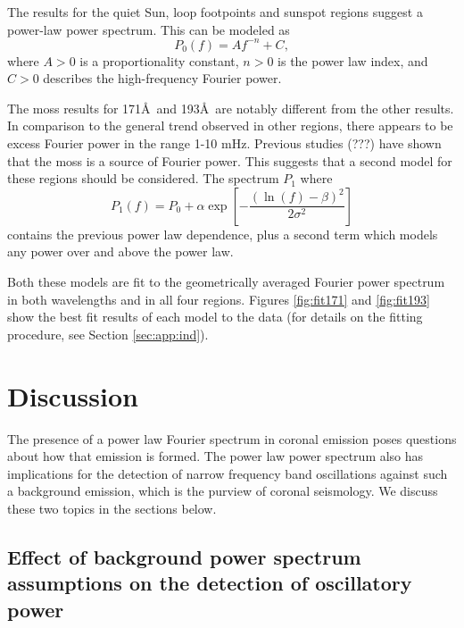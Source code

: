 \documentclass[manuscript]{../aastex52/aastex}
\begin{document}
The results for the quiet Sun, loop footpoints and sunspot regions
suggest a power-law power spectrum.  This can be modeled as
\begin{equation}
\label{eq:pwrlaw}
P_{0}(f) = Af^{-n} + C,
\end{equation}
where $A>0$ is a proportionality constant, $n>0$ is the power law
index, and $C>0$ describes the high-frequency Fourier power.

The moss results for 171\AA\ and 193\AA\ are notably different from
the other results.  In comparison to the general trend observed in
other regions, there appears to be excess Fourier power in the range
1-10 mHz.  Previous studies (???) have shown that the moss is a source
of Fourier power.  This suggests that a second model for these regions
should be considered.  The spectrum $P_{1}$ where
\begin{equation}
\label{eq:pwrlawbump}
P_{1}(f) = P_{0} + \alpha\exp\left[-\frac{(\ln(f)-\beta)^{2}}{2\sigma^{2}}\right]
\end{equation}
contains the previous power law dependence, plus a second term which
models any power over and above the power law.  

Both these models are fit to the geometrically averaged Fourier power
spectrum in both wavelengths and in all four regions.  Figures
\ref{fig:fit171} and \ref{fig:fit193} show the best fit results of
each model to the data (for details on the fitting procedure, see
Section \ref{sec:app:ind}).



\section{Discussion}
The presence of a power law Fourier spectrum in coronal emission poses
questions about how that emission is formed.  The power law power
spectrum also has implications for the detection of narrow frequency
band oscillations against such a background emission, which is the
purview of coronal seismology.  We discuss these two topics in the
sections below.


\subsection{Effect of background power spectrum assumptions on the
  detection of oscillatory power}
\label{ssec:corseis}
\end{document}
